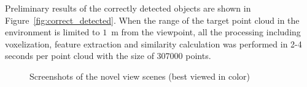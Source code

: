 \documentclass[a4paper, 10 pt, conference]{sty/ieeeconf}
\begin{document}
Preliminary results of the correctly detected objects are shown in Figure~\ref{fig:correct_detected}. 
When the range of the target point cloud in the environment is limited to $1$~m from the viewpoint, 
all the processing including voxelization, feature extraction and similarity calculation was performed 
in 2-4 seconds per point cloud with the size of 307000 points.


\begin{figure}[tb!]
  \centering
 \caption{Screenshots of the novel view scenes (best viewed in color) }
 \label{fig:novel_views}
\end{figure}
\end{document}
